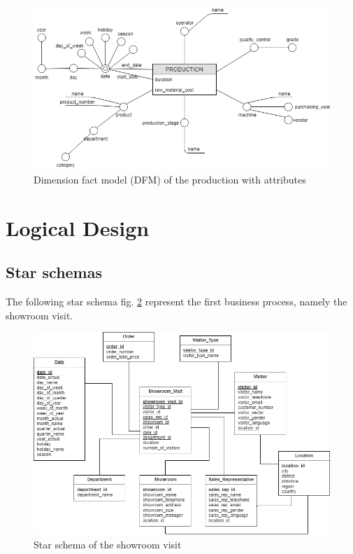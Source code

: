 \documentclass[letterpaper,12pt]{article}
\begin{document}
\begin{figure}[h] 
        \centering
        \includegraphics[width=\columnwidth]{../images/DFM_Production.png}
        \caption{
                \label{fig:productionAttributes}  
                Dimension fact model (DFM) of the production with attributes 
        }
\end{figure}

\section{Logical Design}

\subsection{Star schemas}

The following star schema fig. \ref{fig:starschemaShowroom} represent the first business process, namely the showroom visit.

\begin{figure}[h] 
        \centering
        \includegraphics[width=\columnwidth]{../images/Starschema_Showroom_visit.png}
        \caption{
                \label{fig:starschemaShowroom}  
                Star schema of the showroom visit
        }
\end{figure}
\end{document}
